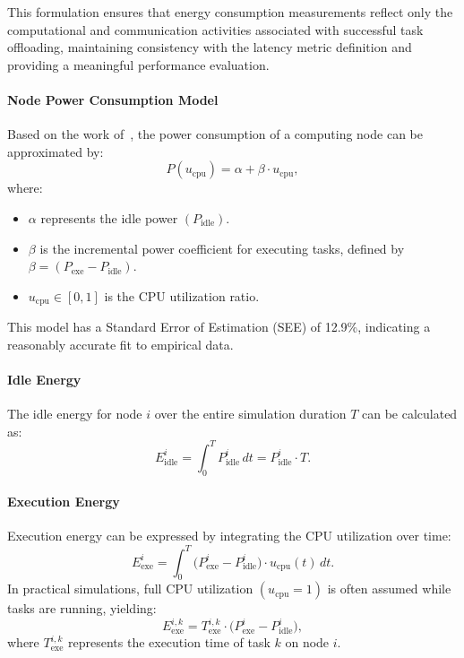 \documentclass[preprint,3p,authoryear]{elsarticle}
\begin{document}
This formulation ensures that energy consumption measurements reflect only the computational and communication activities associated with successful task offloading, maintaining consistency with the latency metric definition and providing a meaningful performance evaluation.

\paragraph{Node Power Consumption Model}
Based on the work of~\cite{ismail_computing_2021}, the power consumption of a computing node can be approximated by:
\begin{equation}
P(u_{\text{cpu}}) = \alpha + \beta \cdot u_{\text{cpu}},
\end{equation}
where:
\begin{itemize}
    \item \(\alpha\) represents the idle power \((P_{\text{idle}})\).
    \item \(\beta\) is the incremental power coefficient for executing tasks, defined by \(\beta = (P_{\text{exe}} - P_{\text{idle}})\).
    \item \(u_{\text{cpu}} \in [0,1]\) is the CPU utilization ratio.
\end{itemize}

This model has a Standard Error of Estimation (SEE) of 12.9\%, indicating a reasonably accurate fit to empirical data. 

\paragraph{Idle Energy}
The idle energy for node \(i\) over the entire simulation duration \(T\) can be calculated as:
\begin{equation}
E_{\text{idle}}^{i} = \int_{0}^{T} P_{\text{idle}}^{i} \, dt = P_{\text{idle}}^{i} \cdot T.
\end{equation}

\paragraph{Execution Energy}
Execution energy can be expressed by integrating the CPU utilization over time:
\begin{equation}
E_{\text{exe}}^{i} = \int_{0}^{T} \bigl(P_{\text{exe}}^{i} - P_{\text{idle}}^{i}\bigr) \cdot u_{\text{cpu}}(t) \, dt.
\end{equation}
In practical simulations, full CPU utilization \((u_{\text{cpu}} = 1)\) is often assumed while tasks are running, yielding:
\begin{equation}
E_{\text{exe}}^{i,k} = T_{\text{exe}}^{i,k} \cdot \bigl(P_{\text{exe}}^{i} - P_{\text{idle}}^{i}\bigr),
\end{equation}
where \(T_{\text{exe}}^{i,k}\) represents the execution time of task \(k\) on node \(i\).
\end{document}
